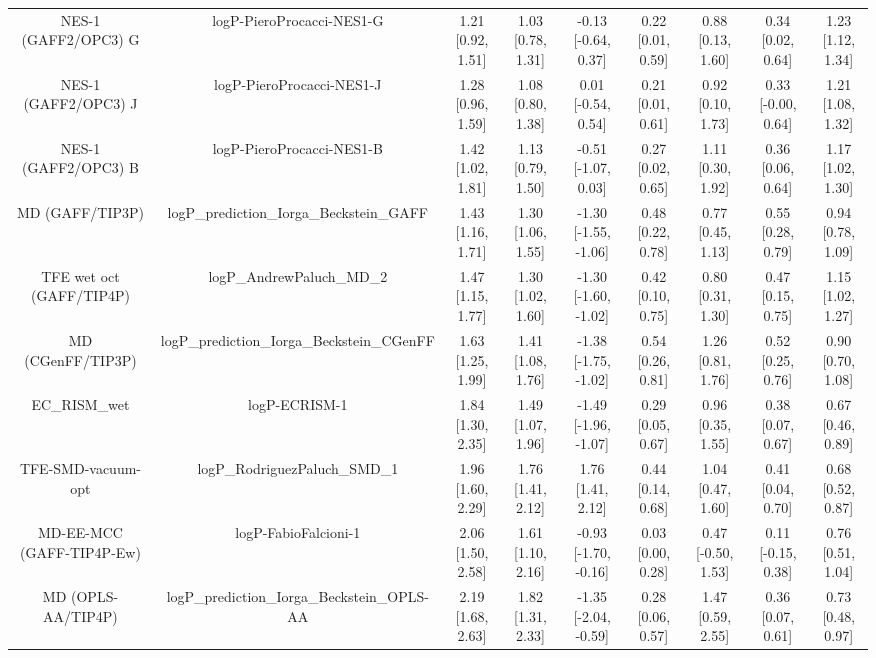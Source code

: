 \documentclass{article}
\begin{document}
\begin{center}
\begin{longtable}{|ccccccccc|}
         NES-1 (GAFF2/OPC3) G &                      logP-PieroProcacci-NES1-G &  1.21 [0.92, 1.51] &  1.03 [0.78, 1.31] &   -0.13 [-0.64, 0.37] &  0.22 [0.01, 0.59] &     0.88 [0.13, 1.60] &     0.34 [0.02, 0.64] &     1.23 [1.12, 1.34] \\
         NES-1 (GAFF2/OPC3) J &                      logP-PieroProcacci-NES1-J &  1.28 [0.96, 1.59] &  1.08 [0.80, 1.38] &    0.01 [-0.54, 0.54] &  0.21 [0.01, 0.61] &     0.92 [0.10, 1.73] &    0.33 [-0.00, 0.64] &     1.21 [1.08, 1.32] \\
         NES-1 (GAFF2/OPC3) B &                      logP-PieroProcacci-NES1-B &  1.42 [1.02, 1.81] &  1.13 [0.79, 1.50] &   -0.51 [-1.07, 0.03] &  0.27 [0.02, 0.65] &     1.11 [0.30, 1.92] &     0.36 [0.06, 0.64] &     1.17 [1.02, 1.30] \\
              MD (GAFF/TIP3P) &       logP\_prediction\_Iorga\_Beckstein\_GAFF &  1.43 [1.16, 1.71] &  1.30 [1.06, 1.55] &  -1.30 [-1.55, -1.06] &  0.48 [0.22, 0.78] &     0.77 [0.45, 1.13] &     0.55 [0.28, 0.79] &     0.94 [0.78, 1.09] \\
     TFE wet oct (GAFF/TIP4P) &                      logP\_AndrewPaluch\_MD\_2 &  1.47 [1.15, 1.77] &  1.30 [1.02, 1.60] &  -1.30 [-1.60, -1.02] &  0.42 [0.10, 0.75] &     0.80 [0.31, 1.30] &     0.47 [0.15, 0.75] &     1.15 [1.02, 1.27] \\
            MD (CGenFF/TIP3P) &     logP\_prediction\_Iorga\_Beckstein\_CGenFF &  1.63 [1.25, 1.99] &  1.41 [1.08, 1.76] &  -1.38 [-1.75, -1.02] &  0.54 [0.26, 0.81] &     1.26 [0.81, 1.76] &     0.52 [0.25, 0.76] &     0.90 [0.70, 1.08] \\
                  EC_RISM_wet &                                  logP-ECRISM-1 &  1.84 [1.30, 2.35] &  1.49 [1.07, 1.96] &  -1.49 [-1.96, -1.07] &  0.29 [0.05, 0.67] &     0.96 [0.35, 1.55] &     0.38 [0.07, 0.67] &     0.67 [0.46, 0.89] \\
           TFE-SMD-vacuum-opt &                  logP\_RodriguezPaluch\_SMD\_1 &  1.96 [1.60, 2.29] &  1.76 [1.41, 2.12] &     1.76 [1.41, 2.12] &  0.44 [0.14, 0.68] &     1.04 [0.47, 1.60] &     0.41 [0.04, 0.70] &     0.68 [0.52, 0.87] \\
    MD-EE-MCC (GAFF-TIP4P-Ew) &                           logP-FabioFalcioni-1 &  2.06 [1.50, 2.58] &  1.61 [1.10, 2.16] &  -0.93 [-1.70, -0.16] &  0.03 [0.00, 0.28] &    0.47 [-0.50, 1.53] &    0.11 [-0.15, 0.38] &     0.76 [0.51, 1.04] \\
           MD (OPLS-AA/TIP4P) &    logP\_prediction\_Iorga\_Beckstein\_OPLS-AA &  2.19 [1.68, 2.63] &  1.82 [1.31, 2.33] &  -1.35 [-2.04, -0.59] &  0.28 [0.06, 0.57] &     1.47 [0.59, 2.55] &     0.36 [0.07, 0.61] &     0.73 [0.48, 0.97] \\

\end{longtable}
\end{center}
\end{document}

